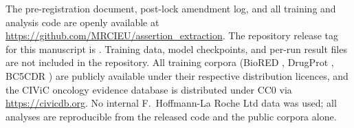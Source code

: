 
The pre-registration document, post-lock amendment log, and all
training and analysis code are openly available at
\url{https://github.com/MRCIEU/assertion_extraction}. The repository
release tag for this manuscript is .
Training data, model checkpoints, and per-run result files are not
included in the repository. All training corpora (BioRED
\citep{luo2022biored}, DrugProt \citep{miranda2023drugprot}, BC5CDR
\citep{li2016bc5cdr}) are publicly available under their respective
distribution licences, and the CIViC oncology evidence database
\citep{griffith2017civic} is distributed under CC0 via
\url{https://civicdb.org}. No internal F.\ Hoffmann-La Roche Ltd
data was used; all analyses are reproducible from the released code
and the public corpora alone.